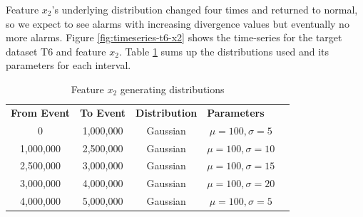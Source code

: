 \documentclass[sigconf]{acmart}
\begin{document}
Feature $x_2$'s underlying distribution changed four times and returned to normal, so we expect to see alarms with increasing divergence values but eventually no more alarms. Figure \ref{fig:timeseries-t6-x2} shows the time-series for the target dataset T6 and feature $x_2$. Table \ref{tbl:multi-feat-x2-changes} sums up the distributions used and its parameters for each interval.
\begin{table}[!htb]
    \begin{center}
    \begin{tabular}{|c|c|c|c|l}
    \cline{1-4}
    \textbf{From Event} & \textbf{To Event} & \textbf{Distribution} & \multicolumn{1}{l|}{\textbf{Parameters}} &  \\ \cline{1-4}
    0                   & 1,000,000         & Gaussian              & $\mu=100, \sigma=5$                      &  \\ \cline{1-4}
    1,000,000           & 2,500,000         & Gaussian              & $\mu=100, \sigma=10$                     &  \\ \cline{1-4}
    2,500,000           & 3,000,000         & Gaussian              & $\mu=100, \sigma=15$                     &  \\ \cline{1-4}
    3,000,000           & 4,000,000         & Gaussian              & $\mu=100, \sigma=20$                      &  \\ \cline{1-4}
    4,000,000           & 5,000,000         & Gaussian              & $\mu=100, \sigma=5$                      &  \\ \cline{1-4}
    \end{tabular}
    \end{center}
    \caption{Feature $x_2$ generating distributions}
    \label{tbl:multi-feat-x2-changes}
\end{table}
\end{document}
